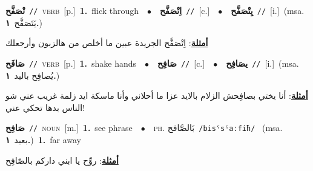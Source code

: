 \documentclass[10pt,a4paper,twoside]{article} %
\begin{document}
\begin{multicols}{2}
{\setlength\topsep{0pt}\textbf{\foreignlanguage{arabic}{تْصَفَّح}}\ {\color{gray}\texttt{//}\color{black}}\ \textsc{verb}\ [p.]\ \textbf{1.}~flick through\ \ $\bullet$\ \ \setlength\topsep{0pt}\textbf{\foreignlanguage{arabic}{اِتْصَفَّح}}\ {\color{gray}\texttt{//}\color{black}}\ [c.]\ \ $\bullet$\ \ \setlength\topsep{0pt}\textbf{\foreignlanguage{arabic}{يِتْصَفَّح}}\ {\color{gray}\texttt{//}\color{black}}\ [i.]\ \color{gray}(msa. \foreignlanguage{arabic}{يَتَصَفَّح}~\foreignlanguage{arabic}{\textbf{١.}})\color{black}\  \begin{flushright}\color{gray}\foreignlanguage{arabic}{\textbf{\underline{\foreignlanguage{arabic}{أمثلة}}}: اِتْصَفَّح الجريدة عبين ما أخلص من هالزبون وأرجعلك}\end{flushright}\color{black}} \vspace{2mm}

{\setlength\topsep{0pt}\textbf{\foreignlanguage{arabic}{صَافَح}}\ {\color{gray}\texttt{//}\color{black}}\ \textsc{verb}\ [p.]\ \textbf{1.}~shake hands\ \ $\bullet$\ \ \setlength\topsep{0pt}\textbf{\foreignlanguage{arabic}{صَافِح}}\ {\color{gray}\texttt{//}\color{black}}\ [c.]\ \ $\bullet$\ \ \setlength\topsep{0pt}\textbf{\foreignlanguage{arabic}{يصَافِح}}\ {\color{gray}\texttt{//}\color{black}}\ [i.]\ \color{gray}(msa. \foreignlanguage{arabic}{يُصافِح باليد}~\foreignlanguage{arabic}{\textbf{١.}})\color{black}\  \begin{flushright}\color{gray}\foreignlanguage{arabic}{\textbf{\underline{\foreignlanguage{arabic}{أمثلة}}}: أنا يختي بصافِحش الزلام بالايد عزا ما أحلاني وأنا ماسكة ايد زلمة غريب عني شو الناس بدها تحكي عني!}\end{flushright}\color{black}} \vspace{2mm}

{\setlength\topsep{0pt}\textbf{\foreignlanguage{arabic}{صَافِح}}\ {\color{gray}\texttt{//}\color{black}}\ \textsc{noun}\ [m.]\ \textbf{1.}~see phrase\ \ $\bullet$\ \ \textsc{ph.} \color{gray} \foreignlanguage{arabic}{بَالصَّافح}\color{black}\ {\color{gray}\texttt{/{\sffamily bisˤsˤaːfiħ}/}\color{black}}\ \color{gray} (msa. \foreignlanguage{arabic}{بعيد}~\foreignlanguage{arabic}{\textbf{١.}})\color{black}\ \textbf{1.}~far away\  \begin{flushright}\color{gray}\foreignlanguage{arabic}{\textbf{\underline{\foreignlanguage{arabic}{أمثلة}}}: روِّح يا ابني داركم بالصّافِح}\end{flushright}\color{black}} \vspace{2mm}


\end{multicols}
\end{document}
